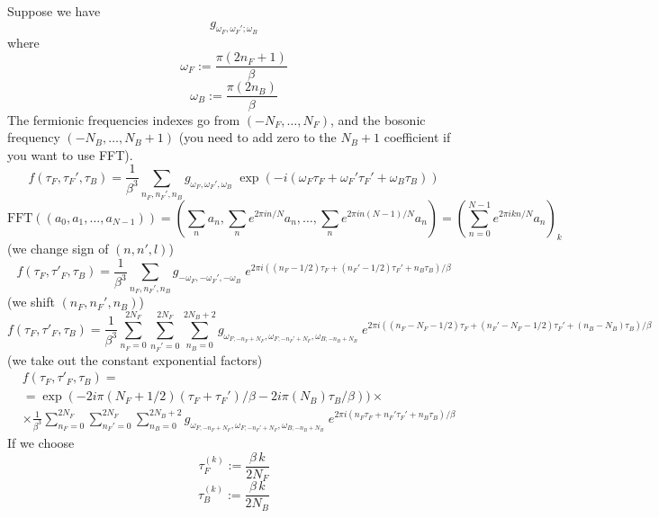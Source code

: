 \documentclass[11pt]{article}
\author{Riccardo Rossi}
\date{\today}
\title{}
\begin{document}
\tableofcontents

Suppose we have
\begin{equation}\label{}
g_{\omega_F, \omega_F'; \omega_B}
\end{equation}
where
\begin{equation}\label{}
  \omega_F := \frac{\pi(2n_F+1)}{\beta}
  \end{equation}
\begin{equation}\label{}
  \omega_B := \frac{\pi(2n_B)}{\beta}
  \end{equation}
The fermionic frequencies indexes go from $(-N_F, \dots, N_F)$, and
the bosonic frequency $(-N_B, \dots, N_B+1)$ (you need to add zero to
the $N_B+1$ coefficient if you want to use FFT).
\begin{equation}
  f(\tau_F,\tau_F',\tau_B) = \frac{1} { \beta ^ 3 } \sum_{n_F, n_F', n_B} g_
  { \omega_F, \omega_F', \omega_B } \;
  \exp\left(-i(\omega_F\tau_F+\omega_F'\tau_F'+\omega_B\tau_B)\right)
\end{equation}
\begin{equation}\label{}
\text{FFT}((a_0, a_1, \dots, a_{N-1}))= (\sum_{n} a_n, \sum_{n}
e^{2\pi i n/N} a_n,\dots, \sum_{n} e^{2\pi i n(N-1)/N} a_n)=
(\sum_{n=0}^{N-1} e^{2\pi i kn/N} a_n)_k
\end{equation}
 (we change sign of $(n, n', l)$)
\begin{equation}\label{}
  f(\tau_F, \tau'_F, \tau_B)=
  \frac{1}{ \beta ^ 3}\sum_{n_F,n_F',n_B}g_{ -\omega_F,
  -\omega_F', -\omega_B}\; e^{2\pi i
  ((n_F-1/2)\tau_F+(n_F'-1/2)\tau_F'+n_B\tau_B)/\beta}
\end{equation}
(we shift $(n_F, n_F', n_B)$)
\begin{equation}\label{}
  f(\tau_F, \tau'_F, \tau_B)
  = \frac{1}{ \beta ^ 3}\sum_{n_F=0}^{
  2N_F} \sum_{n_F'=0}^{ 2N_F}\sum_{n_B=0}^{2N_B+2} g_{ \omega_{F;-n_F + N_F},
  \omega_{F;-n_F' + N_F}, \omega_{B; -n_B + N_B }}\; e^{2\pi i
  ((n_F-N_F-1/2)\tau_F+(n_F'-N_F-1/2)\tau_F'+(n_B-N_B)\tau_B)/\beta}
\end{equation}
(we take out the constant exponential factors)
\begin{equation}\label{}
  \begin{split}
  &f(\tau_F, \tau'_F, \tau_B)=\\
    &=\exp(-2i\pi(N_F+1/2)(\tau_F+\tau_F')/\beta
    -2i\pi(N_B)\tau_B/\beta)
    )\times \\
&\times\frac{1}{ \beta ^ 3}\sum_{n_F=0}^{
  2N_F} \sum_{n_F'=0}^{ 2N_F}\sum_{n_B=0}^{2N_B+2} g_{ \omega_{F;-n_F + N_F},
  \omega_{F;-n_F' + N_F}, \omega_{B; -n_B + N_B }}\; e^{2\pi i
      (n_F\tau_F+n_F'\tau_F'+n_B\tau_B)/\beta}
    \end{split}
\end{equation}
If we choose
\begin{equation}\label{}
  \tau_F^{(k)} := \frac{\beta\,k}{2N_F}
\end{equation}
\begin{equation}\label{}
  \tau_B^{(k)} := \frac{\beta\,k}{2N_B}
\end{equation}
\end{document}
